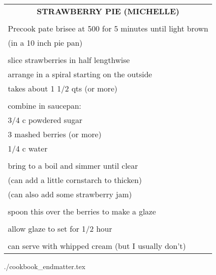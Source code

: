 \documentclass[8pt]{report}
\begin{document}
\begin{tabular}{|l|} \hline	%
 
\multicolumn{1}{|c|}{\textbf{STRAWBERRY PIE (MICHELLE)}}
\\
\\

\index{desserts!strawberry pie (michelle)} \index{strawberry pie}
\index{pie!strawberry}

Precook pate brisee at 500 for 5 minutes until light brown\\
(in a 10 inch pie pan)\\
\\
slice strawberries in half lengthwise\\
arrange in a spiral starting on the outside\\
takes about 1 1/2 qts (or more)\\
\\
combine in saucepan:\\
\hspace{0.5 in}	3/4 c powdered sugar\\
\hspace{0.5 in}	3 mashed berries (or more)\\
\hspace{0.5 in}	1/4 c water\\
\\
bring to a boil and simmer until clear\\
(can add a little cornstarch to thicken)\\
(can also add some strawberry jam)\\
\\
spoon this over the berries to make a glaze\\
\\
allow glaze to set for 1/2 hour\\
\\
can serve with whipped cream (but I usually don't)\\


\hline

\end{tabular}

\newpage
 {./cookbook_endmatter.tex}
\end{document}
